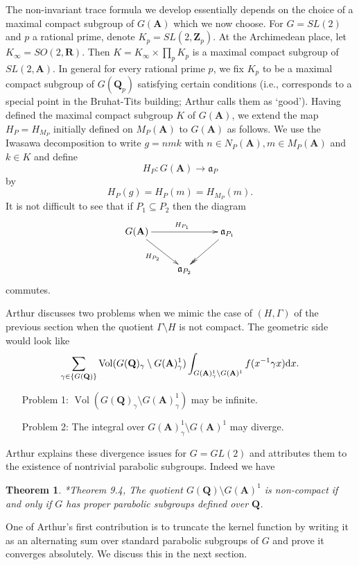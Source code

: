 \documentclass[11pt]{amsart}
\def\A{\mathbf A}
\def\Q{\mathbf Q}
\def\R{\mathbf R}
\def\Z{\mathbf Z}
\def\aaa{\mathfrak a}
\def\d{\text d}
\def\bs{\setminus}
\def\vol{\operatorname{Vol}}
\newtheorem{theorem}{Theorem}[section]
\theoremstyle{remark}
\begin{document}
The non-invariant trace formula we develop essentially depends on the choice of a maximal compact subgroup of $G(\A)$ which we now choose. For $G = SL(2)$ and $p$ a rational prime, denote $K_p = SL(2, \Z_p)$. At the Archimedean place, let $K_\infty = SO(2, \R)$. Then $K = K_\infty \times \prod_p K_p$ is a maximal compact subgroup of $SL(2, \A)$. In general for every rational prime $p$, we fix $K_p$ to be a maximal compact subgroup of $G(\Q_p)$ satisfying certain conditions (i.e., corresponds to a special point in the Bruhat-Tits building; Arthur calls them as `good'). Having defined the maximal compact subgroup $K$ of $G(\A)$, we extend the map $H_P = H_{M_P}$ initially defined on $M_P(\A)$ to $G(\A)$ as follows. We use the Iwasawa decomposition to write $g = nmk$ with $n \in N_P(\A), m \in M_P(\A)$ and $k \in K$ and define
\[ H_P : G(\A) \to \aaa_P \]
by 
\[ H_P(g) = H_P(m) = H_{M_P}(m). \]
It is not difficult to see that if $P_1 \subseteq P_2$ then the diagram 
\[ \xymatrix{ 
	G(\A) \ar[rr]^{H_{P_1}} \ar[dr]_{H_{P_2}} & & \aaa_{P_1} \ar@{->>}[dl] \\ & \aaa_{P_2} & 
	}
\]
commutes.

Arthur discusses two problems when we mimic the case of $(H, \Gamma)$ of the previous section when the quotient $\Gamma\bs H$ is not compact. The geometric side would look like 
\[ \sum_{\gamma \in \{G(\Q)\}} \vol(G(\Q)_\gamma\bs G(\A)_\gamma^1) \int_{G(\A)^1_\gamma \bs G(\A)^1} f(x^{-1}\gamma x) \d x.\]

\begin{itemize}
\item[Problem 1:] $\vol(G(\Q)_\gamma\bs G(\A)_\gamma^1)$ may be infinite. 
\item[Problem 2:] The integral over $G(\A)^1_\gamma \bs G(\A)^1$ may diverge. 
\end{itemize}

Arthur explains these divergence issues for $G = GL(2)$ and attributes them to the existence of nontrivial parabolic subgroups. Indeed we have

\begin{theorem} \cite{MR147566}*{Theorem 9.4}, \cite{MR141672}
The quotient $G(\Q)\bs G(\A)^1$ is non-compact if and only if $G$ has proper parabolic subgroups defined over $\Q$. 
\end{theorem}

One of Arthur's first contribution is to truncate the kernel function by writing it as an alternating sum over standard parabolic subgroups of $G$ and prove it converges absolutely. We discuss this in the next section. 
\end{document}

